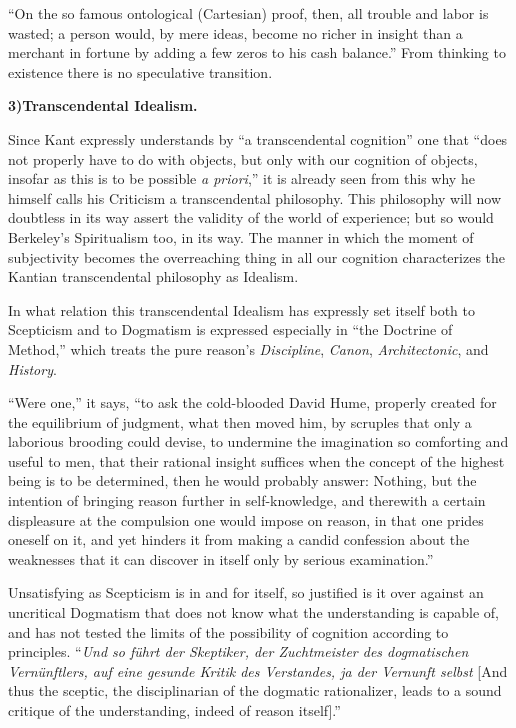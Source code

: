 \documentclass[12pt]{book}
\begin{document}
``On the so famous ontological (Cartesian) proof, then, all trouble and labor is
wasted; a person would, by mere ideas, become no richer in insight than a merchant
in fortune by adding a few zeros to his cash balance.'' From thinking to existence
there is no speculative transition.

\begin{center}{\bfseries 3)\quad Transcendental Idealism.}\end{center}

Since Kant expressly understands by ``a transcendental cognition'' one that ``does
not properly have to do with objects, but only with our cognition of objects,
insofar as this is to be possible \textit{a priori},'' it is already seen from
this why he himself calls his Criticism a transcendental philosophy. This
philosophy will now doubtless in its way assert the validity of the world of
experience; but so would
Berkeley's Spiritualism too, in its way. The manner in which the moment of
subjectivity becomes the overreaching thing in all our cognition characterizes the
Kantian transcendental philosophy as Idealism.

In what relation this transcendental Idealism has expressly set itself both to
Scepticism and to Dogmatism is expressed especially in ``the Doctrine of Method,''
which treats the pure reason's \emph{Discipline}, \emph{Canon},
\emph{Architectonic}, and \emph{History}.

``Were one,'' it says, ``to ask the cold-blooded David Hume, properly created for
the equilibrium of judgment, what then moved him, by scruples that only a
laborious brooding could devise, to undermine the imagination so comforting and
useful to men, that their rational insight suffices when the concept of the
highest being is to be determined, then he would probably answer: Nothing, but the
intention of bringing reason further in self-knowledge, and therewith a certain
displeasure at the compulsion one would impose on reason, in that one prides
oneself on it, and yet hinders it from making a candid confession about the
weaknesses that it can discover in itself only by serious examination.''

Unsatisfying as Scepticism is in and for itself, so justified is it over against
an uncritical Dogmatism that does not know what the understanding is capable of,
and has not tested the limits of the possibility of cognition according to
principles. ``\textit{Und so führt der Skeptiker, der Zuchtmeister des
dogmatischen Vernünftlers, auf eine gesunde Kritik des Verstandes, ja der Vernunft
selbst} [And thus the sceptic, the disciplinarian of the dogmatic rationalizer,
leads to a sound critique of the understanding, indeed of reason itself].''
\end{document}
